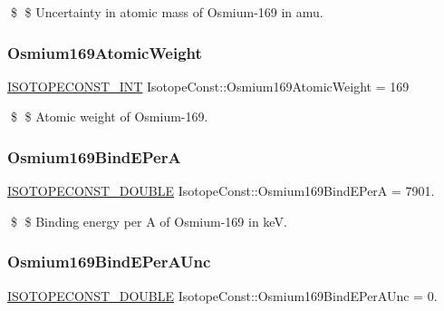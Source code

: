 \$ \$ Uncertainty in atomic mass of Osmium-\/169 in amu. \mbox{\label{group___isotope_const-_osmium-_os169_ga347aca4e9617e515df6161b1ef1059a5}} 
\subsubsection{\texorpdfstring{Osmium169\+Atomic\+Weight}{Osmium169AtomicWeight}}
{\footnotesize\ttfamily \mbox{\hyperlink{group___isotope_const-_macros_ga5f18360b3e99483a35c32d789e62621c}{I\+S\+O\+T\+O\+P\+E\+C\+O\+N\+S\+T\+\_\+\+I\+NT}} Isotope\+Const\+::\+Osmium169\+Atomic\+Weight = 169}

\$ \$ Atomic weight of Osmium-\/169. \mbox{\label{group___isotope_const-_osmium-_os169_ga7337573357aa7e5fd6779c4d7c647de2}} 
\subsubsection{\texorpdfstring{Osmium169\+Bind\+E\+PerA}{Osmium169BindEPerA}}
{\footnotesize\ttfamily \mbox{\hyperlink{group___isotope_const-_macros_ga8f45a7272ce02c0b4c65c44636ed719a}{I\+S\+O\+T\+O\+P\+E\+C\+O\+N\+S\+T\+\_\+\+D\+O\+U\+B\+LE}} Isotope\+Const\+::\+Osmium169\+Bind\+E\+PerA = 7901.}

\$ \$ Binding energy per A of Osmium-\/169 in keV. \mbox{\label{group___isotope_const-_osmium-_os169_ga4353ceff746d75d538bd757e32fdf127}} 
\subsubsection{\texorpdfstring{Osmium169\+Bind\+E\+Per\+A\+Unc}{Osmium169BindEPerAUnc}}
{\footnotesize\ttfamily \mbox{\hyperlink{group___isotope_const-_macros_ga8f45a7272ce02c0b4c65c44636ed719a}{I\+S\+O\+T\+O\+P\+E\+C\+O\+N\+S\+T\+\_\+\+D\+O\+U\+B\+LE}} Isotope\+Const\+::\+Osmium169\+Bind\+E\+Per\+A\+Unc = 0.}

